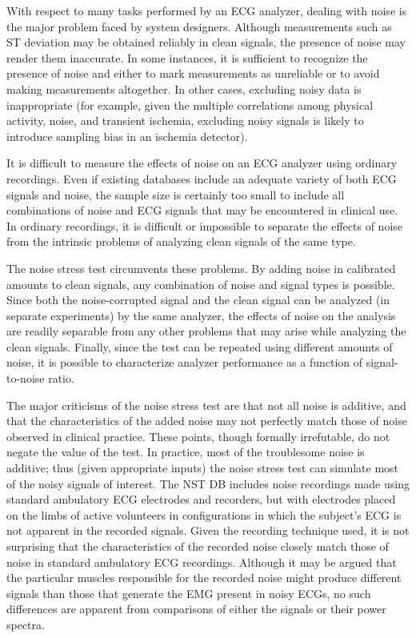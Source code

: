 With respect to many tasks performed by an ECG analyzer, dealing with
noise is the major problem faced by system designers.  Although
measurements such as ST deviation may be obtained reliably in clean
signals, the presence of noise may render them inaccurate.  In some
instances, it is sufficient to recognize the presence of noise and either
to mark measurements as unreliable or to avoid making measurements
altogether.  In other cases, excluding noisy data is inappropriate
(for example, given the multiple correlations among physical
activity, noise, and transient ischemia, excluding noisy signals is
likely to introduce sampling bias in an ischemia detector).

It is difficult to measure the effects of noise on an ECG analyzer
using ordinary recordings.  Even if existing databases include an
adequate variety of both ECG signals and noise, the sample size is
certainly too small to include all combinations of noise and ECG
signals that may be encountered in clinical use.  In ordinary
recordings, it is difficult or impossible to separate the effects of
noise from the intrinsic problems of analyzing clean signals of the
same type.

The noise stress test circumvents these problems.  By adding noise
in calibrated amounts to clean signals, any combination of noise and
signal types is possible.  Since both the noise-corrupted signal and
the clean signal can be analyzed (in separate experiments) by the
same analyzer, the effects of noise on the analysis are readily
separable from any other problems that may arise while analyzing the
clean signals.  Finally, since the test can be repeated using
different amounts of noise, it is possible to characterize analyzer
performance as a function of signal-to-noise ratio.

The major criticisms of the noise stress test are that not all noise
is additive, and that the characteristics of the added noise may not
perfectly match those of noise observed in clinical practice.  These
points, though formally irrefutable, do not negate the value of the
test.  In practice, most of the troublesome noise is additive; thus
(given appropriate inputs) the noise stress test can simulate most of
the noisy signals of interest.  The NST DB includes noise recordings
made using standard ambulatory ECG electrodes and recorders, but with
electrodes placed on the limbs of active volunteers in configurations
in which the subject's ECG is not apparent in the recorded signals.
Given the recording technique used, it is not surprising that the
characteristics of the recorded noise closely match those of noise in
standard ambulatory ECG recordings. Although it may be argued that the
particular muscles responsible for the recorded noise might produce
different signals than those that generate the EMG present in noisy
ECGs, no such differences are apparent from comparisons of either the
signals or their power spectra.

